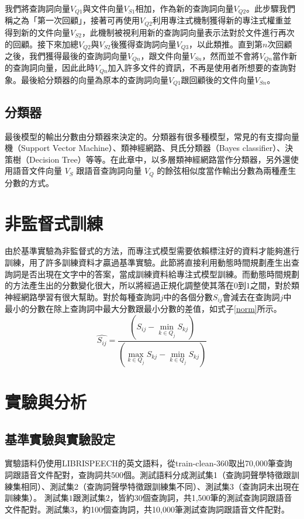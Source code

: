 我們將查詢詞向量$V_{Q1}$與文件向量$V_{S1}$相加，作為新的查詢詞向量$V_{Q2}$。此步驟我們稱之為「第一次回顧」，接著可再使用$V_{Q2}$利用專注式機制獲得新的專注式權重並得到新的文件向量$V_{S2}$，此機制被視利用新的查詢詞向量表示法對於文件進行再次的回顧。接下來加總$V_{Q2}$與$V_{S2}$後獲得查詢詞向量$V_{Q3}$，以此類推。直到第$n$次回顧之後，我們獲得最後的查詢詞向量$V_{Qn}$，跟文件向量$V_{Sn}$，然而並不會將$V_{Qn}$當作新的查詢詞向量，因此此時$V_{Qn}$加入許多文件的資訊，不再是使用者所想要的查詢對象。最後給分類器的向量為原本的查詢詞向量$V_{Q1}$跟回顧後的文件向量$V_{Sn}$。
\subsection{分類器}
最後模型的輸出分數由分類器來決定的。分類器有很多種模型，常見的有支撐向量機（Support
Vector Machine）、類神經網路、貝氏分類器（Bayes
classifier）、決策樹（Decision
Tree）等等。在此章中，以多層類神經網路當作分類器，另外還使用語音文件向量 $V_S$
跟語音查詢詞向量 $V_Q$ 的餘弦相似度當作輸出分數為兩種產生分數的方式。
\label{ch4_classify}
\section{非監督式訓練}

由於基準實驗為非監督式的方法，而專注式模型需要依賴標注好的資料才能夠進行訓練，用了許多訓練資料才贏過基準實驗。此節將直接利用動態時間規劃產生出查詢詞是否出現在文字中的答案，當成訓練資料給專注式模型訓練。而動態時間規劃的方法產生出的分數變化很大，所以將經過正規化調整使其落在$0$到$1$之間，對於類神經網路學習有很大幫助。對於每種查詢詞$j$中的各個分數$S_{ij}$會減去在查詢詞$j$中最小的分數在除上查詢詞中最大分數跟最小分數的差值，如式子\ref{norm}所示。
\begin{equation}
\label{norm}
\hat{S_{ij}} = \frac{(S_{ij}- \min_{k \in Q_j} S_{kj})} { (\max_{k \in
		Q_j} S_{kj} - \min_{k \in Q_j} S_{kj})}
\end{equation}
\section{實驗與分析}
\subsection{基準實驗與實驗設定}
實驗語料仍使用LIBRISPEECH的英文語料，從train-clean-360取出70,000筆查詢詞跟語音文件配對，查詢詞共500個。測試語料分成測試集1（查詢詞聲學特徵跟訓練集相同）、測試集2（查詢詞聲學特徵跟訓練集不同）、測試集3（查詢詞未出現在訓練集）。
測試集$1$跟測試集$2$，皆約30個查詢詞，共1,500筆的測試查詢詞跟語音文件配對。測試集$3$，約100個查詢詞，共10,000筆測試查詢詞跟語音文件配對。

